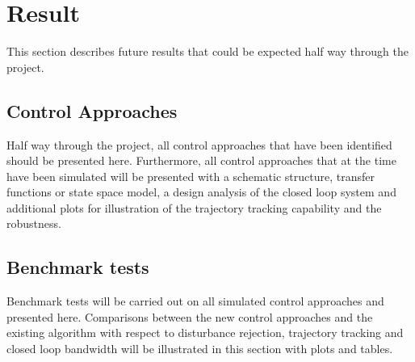 \chapter{Result}\label{cha:result}
This section describes future results that could be expected half way through the project.

\section{Control Approaches}
Half way through the project, all control approaches that have been identified should be presented here. Furthermore, all control approaches that at the time have been simulated will be presented with a schematic structure, transfer functions or state space model, a design analysis of the closed loop system and additional plots for illustration of the trajectory tracking capability and the robustness.

\section{Benchmark tests}
Benchmark tests will be carried out on all simulated control approaches and presented here. Comparisons between the new control approaches and the existing algorithm with respect to disturbance rejection, trajectory tracking and closed loop bandwidth will be illustrated in this section with plots and tables.
